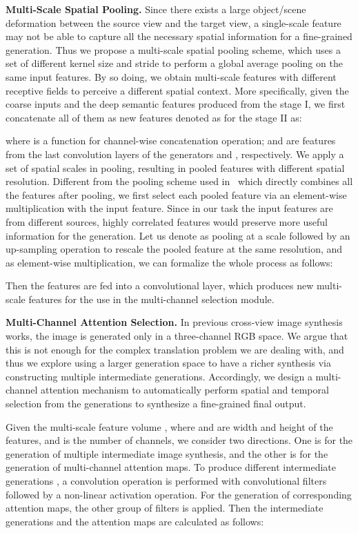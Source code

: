 \documentclass[10pt,twocolumn,letterpaper]{article}
\begin{document}
\noindent \textbf{Multi-Scale Spatial Pooling.}
Since there exists a large object/scene deformation between the source view and the target view, a single-scale feature may not be able to capture all the necessary spatial information for a fine-grained generation. Thus we propose a multi-scale spatial pooling scheme, which uses a set of different kernel size and stride to perform a global average pooling on the same input features. By so doing, we obtain multi-scale features with different receptive fields to perceive a different spatial context. More specifically, given the coarse inputs and the deep semantic features produced from the stage I, we first concatenate all of them as new features denoted as  for the stage II as:
\vspace{-0.1cm}

where  is a function for channel-wise concatenation operation;  and  are features from the last convolution layers of the generators  and , respectively. We apply a set of  spatial scales  in pooling, resulting in pooled features with different spatial resolution.
Different from the pooling scheme used in~\cite{zhao2017pyramid} which directly combines all the features after pooling, we first select each pooled feature via an element-wise multiplication with the input feature. 
Since in our task the input features are from different sources, 
highly correlated features would preserve more useful information for the generation. Let us denote  as pooling at a scale  followed by an up-sampling operation to rescale the pooled feature at the same resolution, and  as element-wise multiplication, we can formalize the whole process as follows:
\vspace{-0.1cm}

Then the features  are fed into a convolutional layer, which produces new multi-scale features  for the use in the multi-channel selection module. 

\noindent \textbf{Multi-Channel Attention Selection.} 
In previous cross-view image synthesis works, the image is generated only in a three-channel RGB space. We argue that this is not enough for the complex translation problem we are dealing with, and thus we explore using a larger generation space to have a richer synthesis via constructing multiple intermediate generations.
Accordingly, we design a multi-channel attention mechanism to automatically perform spatial and temporal selection from the generations to synthesize a fine-grained final output.

\par Given the multi-scale feature volume , where  and  are width and height of the features, and  is the number of channels, we consider two directions. One is for the generation of multiple intermediate image synthesis, and the other is for the generation of multi-channel attention maps. To produce  different intermediate generations , a convolution operation is performed with  convolutional filters  followed by a  non-linear activation operation. For the generation of corresponding  attention maps, the other group of filters  is applied. Then the intermediate generations and the attention maps are calculated as follows:
\vspace{-0.1cm}
\end{document}

